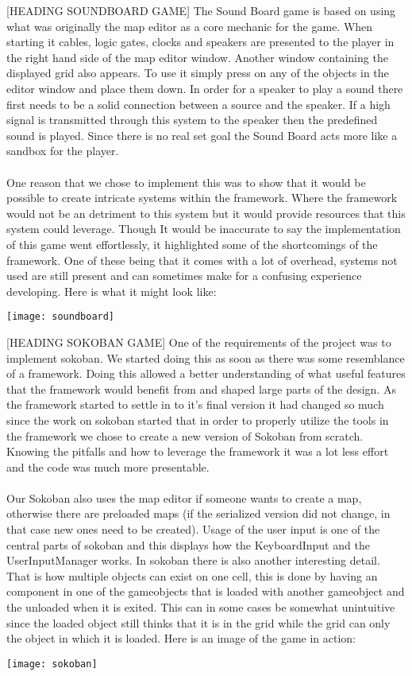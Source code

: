 \documentclass[main.tex]{subfiles}
\begin{document}
[HEADING SOUNDBOARD GAME]
The Sound Board game is based on using what was originally the map editor as a core mechanic for the game. When starting it cables, logic gates, clocks and speakers are presented to the player in the right hand side of the map editor window. Another window containing the displayed grid also appears. To use it simply press on any of the objects in the editor window and place them down. In order for a speaker to play a sound there first needs to be a solid connection between a source and the speaker. If a high signal is transmitted through this system to the speaker then the predefined sound is played.  Since there is no real set goal the Sound Board acts more like a sandbox for the player.
\\ \\
One reason that we chose to implement this was to show that it would be possible to create intricate systems within the framework. Where the framework would not be an detriment to this system but it would provide resources that this system could leverage. Though It would be inaccurate to say the implementation of this game went effortlessly, it highlighted some of the shortcomings of the framework. One of these being that it comes with a lot of overhead, systems not used are still present and can sometimes make for a confusing experience developing.
Here is what it might look like:
\begin{center}
\texttt{[image: soundboard]}
\end{center}
[HEADING SOKOBAN GAME]
One of the requirements of the project was to implement sokoban. We started doing this as soon as there was some resemblance of a framework. Doing this allowed a better understanding of what useful features that the framework would benefit from and shaped large parts of the design. As the framework started to settle in to it’s final version it had changed so much since the work on sokoban started that in order to properly utilize the tools in the framework we chose to create a new version of Sokoban from scratch. Knowing the pitfalls and how to leverage the framework it was a lot less effort and the code was much more presentable.
\\ \\
Our Sokoban also uses the map editor if someone wants to create a map, otherwise there are preloaded maps (if the serialized version did not change, in that case new ones need to be created). Usage of the user input is one of the central parts of sokoban and this displays how the KeyboardInput and the UserInputManager works. In sokoban there is also another interesting detail. That is how multiple objects can exist on one cell, this is done by having an component in one of the gameobjects that is loaded with another gameobject and the unloaded when it is exited. This can in some cases be somewhat unintuitive since the loaded object still thinks that it is in the grid while the grid can only the object in which it is loaded.
Here is an image of the game in action:
\begin{center}
\texttt{[image: sokoban]}
\end{center}
\end{document}

